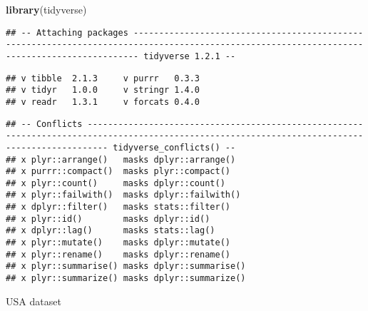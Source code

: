 \documentclass[]{article}
\newenvironment{Shaded}{\begin{snugshade}}{\end{snugshade}}
\newcommand{\DataTypeTok}[1]{\textcolor[rgb]{0.13,0.29,0.53}{#1}}
\newcommand{\KeywordTok}[1]{\textcolor[rgb]{0.13,0.29,0.53}{\textbf{#1}}}
\newcommand{\NormalTok}[1]{#1}
\newcommand{\OperatorTok}[1]{\textcolor[rgb]{0.81,0.36,0.00}{\textbf{#1}}}
\newcommand{\StringTok}[1]{\textcolor[rgb]{0.31,0.60,0.02}{#1}}
\begin{document}
\begin{Shaded}
\begin{Highlighting}[]
\KeywordTok{library}\NormalTok{(tidyverse)}
\end{Highlighting}
\end{Shaded}

\begin{verbatim}
## -- Attaching packages --------------------------------------------------------------------------------------------------------------------------------------------- tidyverse 1.2.1 --
\end{verbatim}

\begin{verbatim}
## v tibble  2.1.3     v purrr   0.3.3
## v tidyr   1.0.0     v stringr 1.4.0
## v readr   1.3.1     v forcats 0.4.0
\end{verbatim}

\begin{verbatim}
## -- Conflicts ------------------------------------------------------------------------------------------------------------------------------------------------ tidyverse_conflicts() --
## x plyr::arrange()   masks dplyr::arrange()
## x purrr::compact()  masks plyr::compact()
## x plyr::count()     masks dplyr::count()
## x plyr::failwith()  masks dplyr::failwith()
## x dplyr::filter()   masks stats::filter()
## x plyr::id()        masks dplyr::id()
## x dplyr::lag()      masks stats::lag()
## x plyr::mutate()    masks dplyr::mutate()
## x plyr::rename()    masks dplyr::rename()
## x plyr::summarise() masks dplyr::summarise()
## x plyr::summarize() masks dplyr::summarize()
\end{verbatim}

\begin{Shaded}
\end{Shaded}

USA dataset
\end{document}
